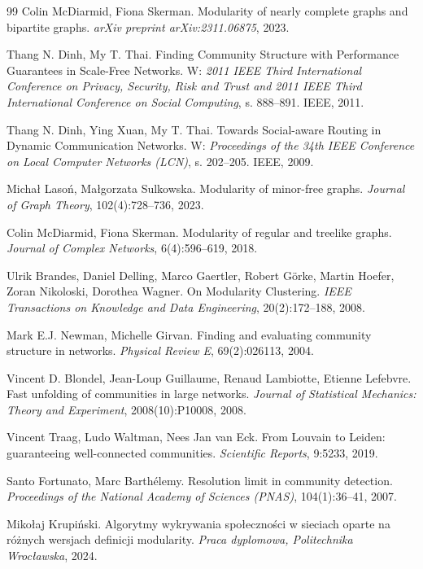 \documentclass{beamer}
\begin{document}
\begin{thebibliography}{99}
    Colin McDiarmid, Fiona Skerman.
    \newblock Modularity of nearly complete graphs and bipartite graphs.
    \newblock \emph{arXiv preprint arXiv:2311.06875}, 2023.

    Thang N. Dinh, My T. Thai.
    \newblock Finding Community Structure with Performance Guarantees in Scale-Free Networks.
    \newblock W: \emph{2011 IEEE Third International Conference on Privacy, Security, Risk and Trust and 2011 IEEE Third International Conference on Social Computing}, s. 888--891. IEEE, 2011.

    Thang N. Dinh, Ying Xuan, My T. Thai.
    \newblock Towards Social-aware Routing in Dynamic Communication Networks.
    \newblock W: \emph{Proceedings of the 34th IEEE Conference on Local Computer Networks (LCN)}, s. 202--205. IEEE, 2009.

    Michał Lasoń, Małgorzata Sulkowska.
    \newblock Modularity of minor-free graphs.
    \newblock \emph{Journal of Graph Theory}, 102(4):728--736, 2023.

    Colin McDiarmid, Fiona Skerman.
    \newblock Modularity of regular and treelike graphs.
    \newblock \emph{Journal of Complex Networks}, 6(4):596--619, 2018.

    Ulrik Brandes, Daniel Delling, Marco Gaertler, Robert Görke, Martin Hoefer, Zoran Nikoloski, Dorothea Wagner.
    \newblock On Modularity Clustering.
    \newblock \emph{IEEE Transactions on Knowledge and Data Engineering}, 20(2):172--188, 2008.

    Mark E.J. Newman, Michelle Girvan.
    \newblock Finding and evaluating community structure in networks.
    \newblock \emph{Physical Review E}, 69(2):026113, 2004.

    Vincent D. Blondel, Jean-Loup Guillaume, Renaud Lambiotte, Etienne Lefebvre.
    \newblock Fast unfolding of communities in large networks.
    \newblock \emph{Journal of Statistical Mechanics: Theory and Experiment}, 2008(10):P10008, 2008.

    Vincent Traag, Ludo Waltman, Nees Jan van Eck.
    \newblock From Louvain to Leiden: guaranteeing well-connected communities.
    \newblock \emph{Scientific Reports}, 9:5233, 2019.

    Santo Fortunato, Marc Barthélemy.
    \newblock Resolution limit in community detection.
    \newblock \emph{Proceedings of the National Academy of Sciences (PNAS)}, 104(1):36--41, 2007.

    Mikołaj Krupiński.
    \newblock Algorytmy wykrywania społeczności w sieciach oparte na różnych wersjach definicji modularity.
    \newblock \emph{Praca dyplomowa, Politechnika Wrocławska}, 2024.

\end{thebibliography}
\end{document}
